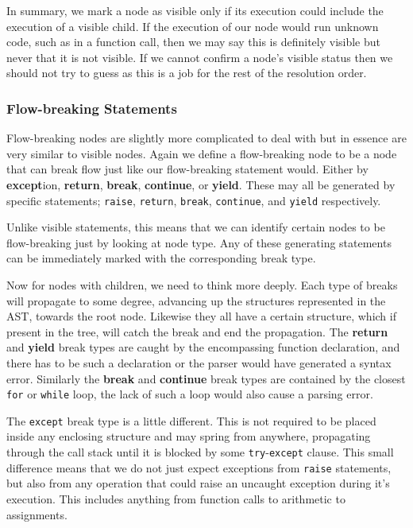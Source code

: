 \documentclass{report}
\begin{document}
In summary, we mark a node as visible only if its execution could include the execution of a visible child. If the execution of our node would run unknown
code, such as in a function call, then we may say this is definitely visible but never that it is not visible. If we cannot confirm a node's visible status
then we should not try to guess as this is a job for the rest of the resolution order.

\subsubsection{Flow-breaking Statements}

Flow-breaking nodes are slightly more complicated to deal with but in essence are very similar to visible nodes. Again we define a flow-breaking node
to be a node that can break flow just like our flow-breaking statement would. Either by \textbf{except}ion, \textbf{return}, \textbf{break}, \textbf{continue},
or \textbf{yield}. These may all be generated by specific statements; \texttt{raise}, \texttt{return}, \texttt{break}, \texttt{continue}, and \texttt{yield}
respectively.

Unlike visible statements, this means that we can identify certain nodes to be flow-breaking just by looking at node type. Any of these generating statements
can be immediately marked with the corresponding break type.

Now for nodes with children, we need to think more deeply. Each type of breaks will propagate to some degree, advancing up the structures represented in the
AST, towards the root node. Likewise they all have a certain structure, which if present in the tree, will catch the break and end the propagation. The
\textbf{return} and \textbf{yield} break types are caught by the encompassing function declaration, and there has to be such a declaration or the parser
would have generated a syntax error. Similarly the \textbf{break} and \textbf{continue} break types are contained by the closest \texttt{for} or
\texttt{while} loop, the lack of such a loop would also cause a parsing error.

The \texttt{except} break type is a little different. This is not required to be placed inside any enclosing structure and may spring from anywhere, propagating
through the call stack until it is blocked by some \texttt{try}-\texttt{except} clause. This small difference means that we do not just expect exceptions
from \texttt{raise} statements, but also from any operation that could raise an uncaught exception during it's execution. This
includes anything from function calls to arithmetic to assignments.
\end{document}
